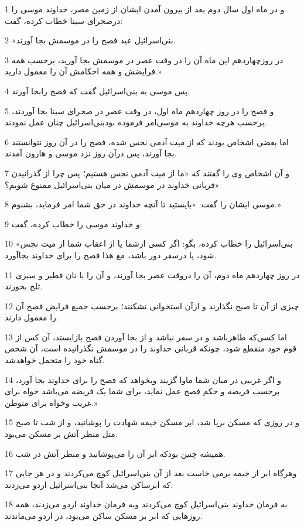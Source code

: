 \par 1 و در ماه اول سال دوم بعد از بیرون آمدن ایشان از زمین مصر، خداوند موسی را درصحرای سینا خطاب کرده، گفت:
\par 2 «بنی‌اسرائیل عید فصح را در موسمش بجا آورند.
\par 3 در روزچهاردهم این ماه آن را در وقت عصر در موسمش بجا آورید، برحسب همه فرایضش و همه احکامش آن را معمول دارید.»
\par 4 پس موسی به بنی‌اسرائیل گفت که فصح رابجا آورند.
\par 5 و فصح را در روز چهاردهم ماه اول، در وقت عصر در صحرای سینا بجا آوردند، برحسب هرچه خداوند به موسی‌امر فرموده بودبنی‌اسرائیل چنان عمل نمودند.
\par 6 اما بعضی اشخاص بودند که از میت آدمی نجس شده، فصح را در آن روز نتوانستند بجا آورند، پس درآن روز نزد موسی و هارون آمدند.
\par 7 و آن اشخاص وی را گفتند که «ما از میت آدمی نجس هستیم؛ پس چرا از گذرانیدن قربانی خداوند در موسمش در میان بنی‌اسرائیل ممنوع شویم؟»
\par 8 موسی ایشان را گفت: «بایستید تا آنچه خداوند در حق شما امر فرماید، بشنوم.»
\par 9 و خداوند موسی را خطاب کرده، گفت:
\par 10 «بنی‌اسرائیل را خطاب کرده، بگو: اگر کسی ازشما یا از اعقاب شما از میت نجس شود، یا درسفر دور باشد، مع هذا فصح را برای خداوند بجاآورد.
\par 11 در روز چهاردهم ماه دوم، آن را دروقت عصر بجا آورند، و آن را با نان فطیر و سبزی تلخ بخورند.
\par 12 چیزی از آن تا صبح نگذارند و ازآن استخوانی نشکنند؛ برحسب جمیع فرایض فصح آن را معمول دارند.
\par 13 اما کسی‌که طاهرباشد و در سفر نباشد و از بجا آوردن فصح بازایستد، آن کس از قوم خود منقطع شود، چونکه قربانی خداوند را در موسمش نگذرانیده است، آن شخص گناه خود را متحمل خواهدشد.
\par 14 و اگر غریبی در میان شما ماوا گزیند وبخواهد که فصح را برای خداوند بجا آورد، برحسب فریضه و حکم فصح عمل نماید، برای شما یک فریضه می‌باشد خواه برای غریب وخواه برای متوطن.»
\par 15 و در روزی که مسکن برپا شد، ابر مسکن خیمه شهادت را پوشانید، و از شب تا صبح مثل منظر آتش بر مسکن می‌بود.
\par 16 همیشه چنین بودکه ابر آن را می‌پوشانید و منظر آتش در شب.
\par 17 وهرگاه ابر از خیمه برمی خاست بعد از آن بنی‌اسرائیل کوچ می‌کردند و در هر جایی که ابرساکن می‌شد آنجا بنی‌اسرائیل اردو می‌زدند.
\par 18 به فرمان خداوند بنی‌اسرائیل کوچ می‌کردند وبه فرمان خداوند اردو می‌زدند، همه روزهایی که ابر بر مسکن ساکن می‌بود، در اردو می‌ماندند.
